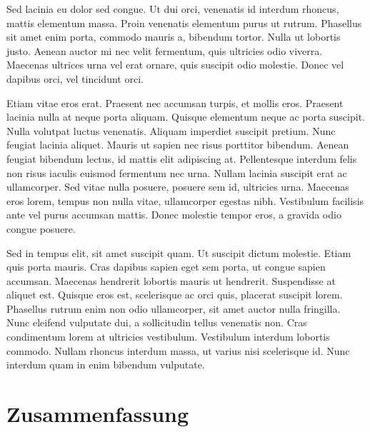 \documentclass[12pt,oneside,a4paper,parskip]{scrbook}
\begin{document}
Sed lacinia eu dolor sed congue. Ut dui orci, venenatis id interdum rhoncus, mattis elementum massa. Proin venenatis elementum purus ut rutrum. Phasellus sit amet enim porta, commodo mauris a, bibendum tortor. Nulla ut lobortis justo. Aenean auctor mi nec velit fermentum, quis ultricies odio viverra. Maecenas ultrices urna vel erat ornare, quis suscipit odio molestie. Donec vel dapibus orci, vel tincidunt orci.

Etiam vitae eros erat. Praesent nec accumsan turpis, et mollis eros. Praesent lacinia nulla at neque porta aliquam. Quisque elementum neque ac porta suscipit. Nulla volutpat luctus venenatis. Aliquam imperdiet suscipit pretium. Nunc feugiat lacinia aliquet. Mauris ut sapien nec risus porttitor bibendum. Aenean feugiat bibendum lectus, id mattis elit adipiscing at. Pellentesque interdum felis non risus iaculis euismod fermentum nec urna. Nullam lacinia suscipit erat ac ullamcorper. Sed vitae nulla posuere, posuere sem id, ultricies urna. Maecenas eros lorem, tempus non nulla vitae, ullamcorper egestas nibh. Vestibulum facilisis ante vel purus accumsan mattis. Donec molestie tempor eros, a gravida odio congue posuere.

Sed in tempus elit, sit amet suscipit quam. Ut suscipit dictum molestie. Etiam quis porta mauris. Cras dapibus sapien eget sem porta, ut congue sapien accumsan. Maecenas hendrerit lobortis mauris ut hendrerit. Suspendisse at aliquet est. Quisque eros est, scelerisque ac orci quis, placerat suscipit lorem. Phasellus rutrum enim non odio ullamcorper, sit amet auctor nulla fringilla. Nunc eleifend vulputate dui, a sollicitudin tellus venenatis non. Cras condimentum lorem at ultricies vestibulum. Vestibulum interdum lobortis commodo. Nullam rhoncus interdum massa, ut varius nisi scelerisque id. Nunc interdum quam in enim bibendum vulputate.

\chapter{Zusammenfassung}


\backmatter
\newpage
{}
{}			
\listoffigures

\listoftables

\end{document}
